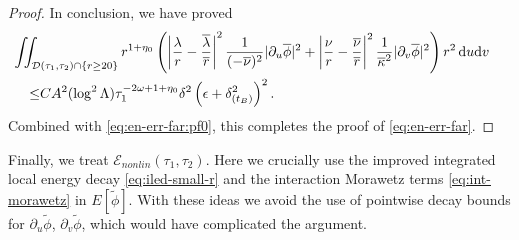 \documentclass[10pt, reqno]{amsart}
\theoremstyle{definition}
\theoremstyle{remark}
\theoremstyle{conjecture}
\numberwithin{equation}{section}
\newcommand{\abs}[1]{\vert#1\vert}
\newcommand{\set}[1]{\{#1\}}
\newcommand{\ud}{\mathrm{d}}
\newcommand{\rd}{\partial}
\newcommand{\0}{\emptyset}
\newcommand{\dlt}{\delta}
\newcommand{\eps}{\epsilon}
\newcommand{\kpp}{\kappa}
\newcommand{\lmb}{\lambda}
\newcommand{\Lmb}{\Lambda}
\newcommand{\omg}{\omega}
\newcommand{\calD}{\mathcal D}
\newcommand{\calE}{\mathcal E}
\newcommand{\dur}{\nu}
\newcommand{\dvr}{\lmb}
\newcommand{\phibg}{\overline{\phi}}				%
\newcommand{\dvrbg}{\overline{\dvr}}				%
\newcommand{\durbg}{\overline{\dur}}				%
\newcommand{\rbg}{\overline{r}}					%
\newcommand{\kppbg}{\overline{\kpp}}					%
\newcommand{\phidf}{\widetilde{\phi}}				%
\newcommand{\Abs}[1]{\left\vert #1 \right\vert}
\begin{document}
\begin{proof}
In conclusion, we have proved
\begin{equation} \label{eq:en-err-far:pf2}
\begin{aligned}
& \hskip-2em
\iint_{\calD(\tau_{1}, \tau_{2}) \cap \set{r \geq 20}} r^{1+\eta_{0}} \left( 
	\Abs{\frac{\dvr}{r} - \frac{\dvrbg}{\rbg}}^{2} \frac{1}{(-\durbg)^{2}}\abs{\rd_{u} \phibg}^{2} 
	+ \Abs{\frac{\dur}{r} - \frac{\durbg}{\rbg}}^{2} \frac{1}{\kppbg^{2}}\abs{\rd_{v} \phibg}^{2} \right) r^{2} \, \ud u \ud v \\
\leq & C A^{2} (\log^{2} \Lmb) \tau_{1}^{-2 \omg + 1 + \eta_{0}} \dlt^{2} \left( \eps + \dlt_{(t_{B})}^{2} \right)^{2}.
\end{aligned}
\end{equation}
Combined with \eqref{eq:en-err-far:pf0}, this completes the proof of \eqref{eq:en-err-far}. \qedhere
\end{proof}
 
Finally, we treat $\calE_{nonlin}(\tau_{1}, \tau_{2})$. Here we crucially use the improved integrated local energy decay \eqref{eq:iled-small-r} and the interaction Morawetz terms \eqref{eq:int-morawetz} in $E[\phidf]$. With these ideas we avoid the use of pointwise decay bounds for $\rd_{u} \phidf$, $\rd_{v} \phidf$, which would have complicated the argument.
\end{document}

